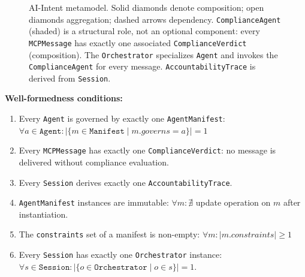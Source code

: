 \documentclass[runningheads]{llncs}
\begin{document}
\begin{figure}[t]
\caption{AI-Intent metamodel. Solid diamonds denote composition;
open diamonds aggregation; dashed arrows dependency.
\texttt{ComplianceAgent} (shaded) is a structural role, not an optional
component: every \texttt{MCPMessage} has exactly one associated
\texttt{ComplianceVerdict} (composition). The \texttt{Orchestrator}
specializes \texttt{Agent} and invokes the \texttt{ComplianceAgent}
for every message. \texttt{AccountabilityTrace}
is derived from \texttt{Session}.}
\label{fig:metamodel}
\end{figure}

\textbf{Well-formedness conditions:}
\begin{enumerate}
    \item Every \texttt{Agent} is governed by exactly one
    \texttt{AgentManifest}: $\forall a \in \mathtt{Agent}: |\{m \in
    \mathtt{Manifest} \mid m.\mathit{governs} = a\}| = 1$
    \item Every \texttt{MCPMessage} has exactly one
    \texttt{ComplianceVerdict}: no message is delivered without
    compliance evaluation.
    \item Every \texttt{Session} derives exactly one
    \texttt{AccountabilityTrace}.
    \item \texttt{AgentManifest} instances are immutable: $\forall m:
    \nexists$ update operation on $m$ after instantiation.
    \item The \texttt{constraints} set of a manifest is non-empty:
    $\forall m: |m.\mathit{constraints}| \geq 1$
    \item Every \texttt{Session} has exactly one \texttt{Orchestrator}
    instance: $\forall s \in \mathtt{Session}: |\{o \in
    \mathtt{Orchestrator} \mid o \in s\}| = 1$.
\end{enumerate}
\end{document}

